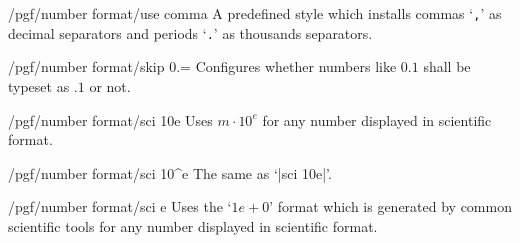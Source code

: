{\begin{key}{/pgf/number format/use comma}
A predefined style which installs commas `\texttt{,}' as decimal separators and periods `\texttt{.}' as thousands separators.

\begin{codeexample}[]
\end{codeexample}
\begin{codeexample}[]
\end{codeexample}
\end{key}

\begin{key}{/pgf/number format/skip 0.=}
	Configures whether numbers like $0.1$ shall be typeset as $.1$ or not.
\begin{codeexample}[]
\end{codeexample}
\begin{codeexample}[]
\end{codeexample}
\end{key}

\begin{key}{/pgf/number format/sci 10e}
Uses $m \cdot 10^e$ for any number displayed in scientific format.

\begin{codeexample}[]
\end{codeexample}
\end{key}

\begin{key}{/pgf/number format/sci 10\textasciicircum e}
The same as `|sci 10e|'.
\end{key}

\begin{key}{/pgf/number format/sci e}
Uses the `$1e{+}0$' format which is generated by common scientific tools for any number displayed in scientific format.

\begin{codeexample}[]
\end{codeexample}
\end{key}

}
